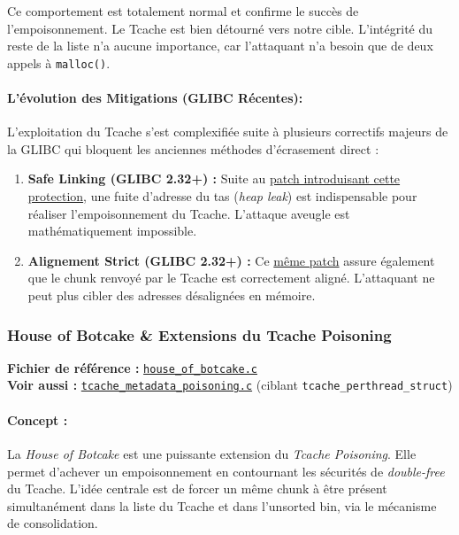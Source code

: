 Ce comportement est totalement normal et confirme le succès de l'empoisonnement. Le Tcache est bien détourné vers notre cible. L'intégrité du reste de la liste n'a aucune importance, car l'attaquant n'a besoin que de deux appels à \texttt{malloc()}.

\paragraph{L'évolution des Mitigations (GLIBC Récentes):}
L'exploitation du Tcache s'est complexifiée suite à plusieurs correctifs majeurs de la GLIBC qui bloquent les anciennes méthodes d'écrasement direct :
\begin{enumerate}
    \item \textbf{Safe Linking (GLIBC 2.32+) :} Suite au \href{https://sourceware.org/git/?p=glibc.git;a=commitdiff;h=a1a486d70ebcc47a686ff5846875eacad0940e41}{patch introduisant cette protection}, une fuite d'adresse du tas (\textit{heap leak}) est indispensable pour réaliser l'empoisonnement du Tcache. L'attaque aveugle est mathématiquement impossible.
    \item \textbf{Alignement Strict (GLIBC 2.32+) :} Ce \href{https://sourceware.org/git/?p=glibc.git;a=commitdiff;h=a1a486d70ebcc47a686ff5846875eacad0940e41}{même patch} assure également que le chunk renvoyé par le Tcache est correctement aligné. L'attaquant ne peut plus cibler des adresses désalignées en mémoire.
\end{enumerate}

\subsubsection{House of Botcake \& Extensions du Tcache Poisoning}

\noindent\textbf{Fichier de référence :} \href{https://github.com/shellphish/how2heap/blob/master/glibc_2.41/house_of_botcake.c}{\texttt{house\_of\_botcake.c}}\\
\noindent\textbf{Voir aussi :} \href{https://github.com/shellphish/how2heap/blob/master/glibc_2.41/tcache_metadata_poisoning.c}{\texttt{tcache\_metadata\_poisoning.c}} (ciblant \texttt{tcache\_perthread\_struct})

\paragraph{Concept :}
La \textit{House of Botcake} est une puissante extension du \textit{Tcache Poisoning}. Elle permet d'achever un empoisonnement en contournant les sécurités de \textit{double-free} du Tcache. L'idée centrale est de forcer un même chunk à être présent simultanément dans la liste du Tcache et dans l'unsorted bin, via le mécanisme de consolidation.

